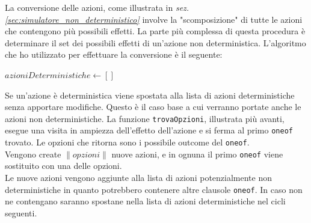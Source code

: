 \documentclass[a4paper, 11pt, titlepage, twoside, openany]{book}
\begin{document}
La conversione delle azioni, come illustrata in \textit{sez. \ref{sec:simulatore_non_deterministico}} involve la "scomposizione" di tutte le azioni che contengono più possibili effetti. La parte più complessa di questa procedura è determinare il set dei possibili effetti di un'azione non deterministica. L'algoritmo che ho utilizzato per effettuare la conversione è il seguente:

\begin{algorithm}
\caption{Conversione Delle Azioni}\label{alg:convert}
$azioniDeterministiche \gets []$\;
\end{algorithm}
Se un'azione è deterministica viene spostata alla lista di azioni deterministiche senza apportare modifiche. Questo è il caso base a cui verranno portate anche le azioni non deterministiche.
La funzione \texttt{trovaOpzioni}, illustrata più avanti, esegue una visita in ampiezza dell'effetto dell'azione e si ferma al primo \texttt{oneof} trovato. Le opzioni che ritorna sono i possibile outcome del \texttt{oneof}. \\
Vengono create $\|opzioni\|$ nuove azioni, e in ognuna il primo \texttt{oneof} viene sostituito con una delle opzioni. \\
Le nuove azioni vengono aggiunte alla lista di azioni potenzialmente non deterministiche in quanto potrebbero contenere altre clausole \texttt{oneof}. In caso non ne contengano saranno spostane nella lista di azioni deterministiche nel cicli seguenti.
\end{document}
